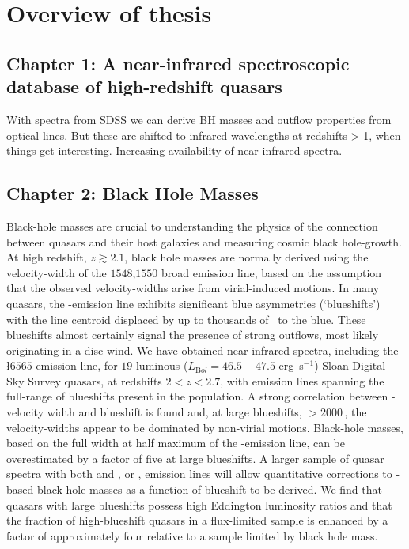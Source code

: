 \section{Overview of thesis}

\subsection{Chapter 1: A near-infrared spectroscopic database of high-redshift quasars}

With spectra from SDSS we can derive BH masses and outflow properties from optical lines. 
But these are shifted to infrared wavelengths at redshifts > 1, when things get interesting. 
Increasing availability of near-infrared spectra. 

\subsection{Chapter 2: Black Hole Masses}

Black-hole masses are crucial to understanding the physics of the connection between quasars and their host galaxies and measuring cosmic black hole-growth. 
At high redshift, $z \gtrsim 2.1$, black hole masses are normally derived using the velocity-width of the \ll$1548$,$1550$ broad emission line, based on the assumption that the observed velocity-widths arise from virial-induced motions.  
In many quasars, the -emission line exhibits significant blue asymmetries (`blueshifts') with the line centroid displaced by up to thousands of \kms\, to the blue. 
These blueshifts almost certainly signal the presence of strong outflows, most likely originating in a disc wind.
We have obtained near-infrared spectra, including the \ha\l$6565$ emission line, for $19$ luminous ($L_{\mathrm Bol} = 46.5-47.5$ erg~s$^{-1}$) Sloan Digital Sky Survey quasars, at redshifts $2 < z < 2.7$, with  emission lines spanning the full-range of blueshifts present in the population.  
A strong correlation between -velocity width and blueshift is found and, at large blueshifts, $>$$2000$\,\kms, the velocity-widths appear to be dominated by non-virial motions. 
Black-hole masses, based on the full width at half maximum of the -emission line, can be overestimated by a factor of five at large blueshifts. 
A larger sample of quasar spectra with both  and \hbns, or \hans, emission lines will allow quantitative corrections to -based black-hole masses as a function of blueshift to be derived. 
We find that quasars with large  blueshifts possess high Eddington luminosity ratios and that the fraction of high-blueshift quasars in a flux-limited sample is enhanced by a factor of approximately four relative to a sample limited by black hole mass.    

